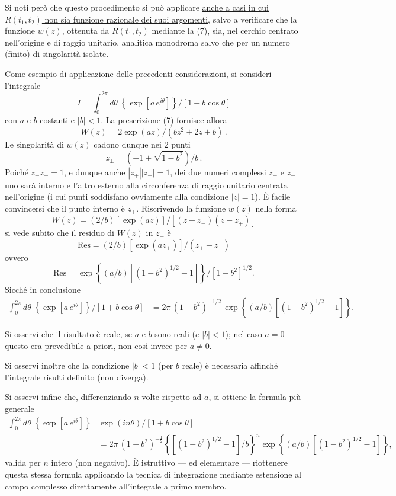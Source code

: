 \documentclass[11pt, a4paper]{book}
\numberwithin{equation}{section}
\begin{document}
Si noti però che questo procedimento si può applicare \underline{anche a casi in cui $R(t_1, t_2)$ non sia funzione razionale dei suoi argomenti}, salvo a verificare che la funzione $w(z)$, ottenuta da $R(t_1, t_2)$ mediante la (7), sia, nel cerchio centrato nell'origine e di raggio unitario, analitica monodroma salvo che per un numero (finito) di singolarità isolate.

Come esempio di applicazione delle precedenti considerazioni, si consideri l'integrale
\[
I = \int_0^{2\pi} d\theta\; \left\{\exp\!\left[a\,e^{i\theta}\right]\right\} \big/ \left[1 + b\cos\theta\right]
\]
con $a$ e $b$ costanti e $|b| < 1$. La prescrizione (7) fornisce allora
\[
W(z) = 2\exp(az) \big/ (bz^2 + 2z + b)\,.
\]
Le singolarità di $w(z)$ cadono dunque nei 2 punti
\[
z_{\pm} = \left(-1 \pm \sqrt{1-b^2}\right)\big/b\,.
\]
Poiché $z_+ z_- = 1$, e dunque anche $|z_+||z_-| = 1$, dei due numeri%
complessi $z_+$ e $z_-$ uno sarà interno e l'altro esterno alla circonferenza di raggio unitario centrata nell'origine (i cui punti soddisfano ovviamente alla condizione $|z|=1$). È facile convincersi che il punto interno è $z_+$. Riscrivendo la funzione $w(z)$ nella forma
\[
W(z) = (2/b)\left[\exp(az)\right] \big/ \left[(z-z_-)(z-z_+)\right]
\]
si vede subito che il residuo di $W(z)$ in $z_+$ è
\[
\mathrm{Res} = (2/b)\left[\exp(az_+)\right] \big/ (z_+ - z_-)
\]
ovvero
\[
\mathrm{Res} = \exp\!\left\{(a/b)\left[(1-b^2)^{1/2}-1\right]\right\} \big/ \left[1-b^2\right]^{1/2}.
\]
Sicché in conclusione
\begin{align*}
\int_0^{2\pi} d\theta\; \left\{\exp\!\left[a\,e^{i\theta}\right]\right\} \big/ \left[1+b\cos\theta\right]
&= 2\pi\,(1-b^2)^{-1/2}\,\exp\!\left\{(a/b)\left[(1-b^2)^{1/2}-1\right]\right\}.
\end{align*}

Si osservi che il risultato è reale, se $a$ e $b$ sono reali ($e$ $|b|<1$); nel caso $a=0$ questo era prevedibile a priori, non così invece per $a \neq 0$.

Si osservi inoltre che la condizione $|b|<1$ (per $b$ reale) è necessaria affinché l'integrale risulti definito (non diverga).

Si osservi infine che, differenziando $n$ volte rispetto ad $a$, si ottiene la formula più generale
\begin{align*}
\int_0^{2\pi} d\theta\; \left\{\exp\!\left[a\,e^{i\theta}\right]\right\} &\exp(in\theta) \big/ \left[1+b\cos\theta\right] \\
&= 2\pi\,(1-b^2)^{-\frac{1}{2}} \left\{\left[(1-b^2)^{1/2}-1\right]/b\right\}^n \exp\!\left\{(a/b)\left[(1-b^2)^{1/2}-1\right]\right\},
\end{align*}
valida per $n$ intero (non negativo). È istruttivo — ed elementare — riottenere questa stessa formula applicando la tecnica di integrazione mediante estensione al campo complesso direttamente all'integrale a primo membro.
\end{document}
